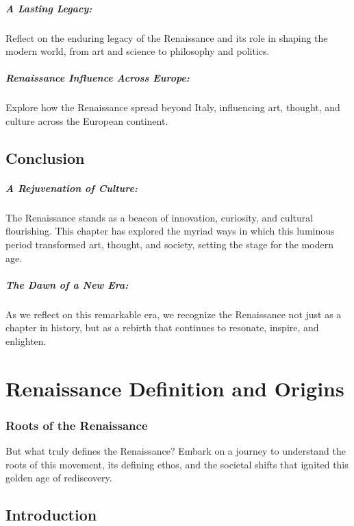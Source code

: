 \documentclass[a4paper,12pt]{book}
\begin{document}
\paragraph{A Lasting Legacy:}
Reflect on the enduring legacy of the Renaissance and its role in shaping the modern world, from art and science to philosophy and politics.

\paragraph{Renaissance Influence Across Europe:}
Explore how the Renaissance spread beyond Italy, influencing art, thought, and culture across the European continent.

\section*{Conclusion}

\paragraph{A Rejuvenation of Culture:}
The Renaissance stands as a beacon of innovation, curiosity, and cultural flourishing. This chapter has explored the myriad ways in which this luminous period transformed art, thought, and society, setting the stage for the modern age.

\paragraph{The Dawn of a New Era:}
As we reflect on this remarkable era, we recognize the Renaissance not just as a chapter in history, but as a rebirth that continues to resonate, inspire, and enlighten.

\chapter{Renaissance Definition and Origins}
\subsection*{Roots of the Renaissance}
But what truly defines the Renaissance? Embark on a journey to understand the roots of this movement, its defining ethos, and the societal shifts that ignited this golden age of rediscovery.

\section*{Introduction}
\end{document}

